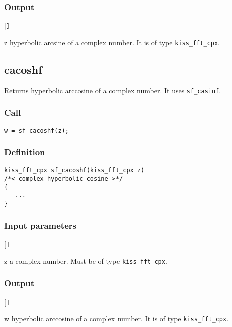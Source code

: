 \subsubsection*{Output}
\begin{desclist}{\tt }{\quad}[\tt ]
   \setlength\itemsep{0pt}
   \item[z] hyperbolic arcsine of a complex number. It is of type \texttt{kiss\_fft\_cpx}.
\end{desclist}



\subsection{{cacoshf}}
Returns hyperbolic arccosine of a complex number. It uses \texttt{sf\_casinf}.

\subsubsection*{Call}
\begin{verbatim}w = sf_cacoshf(z);\end{verbatim}

\subsubsection*{Definition}
\begin{verbatim}
kiss_fft_cpx sf_cacoshf(kiss_fft_cpx z)
/*< complex hyperbolic cosine >*/
{
   ...
}
\end{verbatim}

\subsubsection*{Input parameters}
\begin{desclist}{\tt }{\quad}[\tt ]
   \setlength\itemsep{0pt}
   \item[z] a complex number. Must be of type \texttt{kiss\_fft\_cpx}.
\end{desclist}

\subsubsection*{Output}
\begin{desclist}{\tt }{\quad}[\tt ]
   \setlength\itemsep{0pt}
   \item[w] hyperbolic arccosine of a complex number. It is of type \texttt{kiss\_fft\_cpx}.
\end{desclist}




